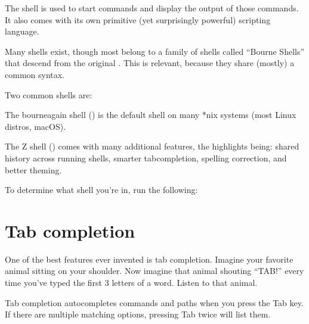 \sphinxAtStartPar
The shell is used to start commands and display the output of those commands.
It also comes with its own primitive (yet surprisingly powerful) scripting language.

\sphinxAtStartPar
Many shells exist, though most belong to a family of shells called “Bourne Shells”
that descend from the original . This is relevant, because they share (mostly)
a common syntax.

\sphinxAtStartPar
Two common shells are:
\begin{description}
\sphinxAtStartPar
The bourne\sphinxhyphen{}again shell () is the default shell on many *nix systems (most Linux distros, macOS).

\sphinxAtStartPar
The Z shell () comes with many additional features, the highlights being:
shared history across running shells, smarter tab\sphinxhyphen{}completion, spelling correction, and better theming.

\end{description}

\sphinxAtStartPar
To determine what shell you’re in, run the following:

\begin{sphinxVerbatim}[commandchars=\\\{\}]
\end{sphinxVerbatim}

\ignorespaces 

\section{Tab completion}
\label{\detokenize{intro/howto:tab-completion}}\label{\detokenize{intro/howto:index-9}}
\sphinxAtStartPar
One of the best features ever invented is tab completion. Imagine your favorite animal sitting
on your shoulder. Now imagine that animal shouting “TAB!” every time you’ve typed the first
3 letters of a word. Listen to that animal.

\sphinxAtStartPar
Tab completion autocompletes commands and paths when you press the Tab key.
If there are multiple matching options, pressing Tab twice will list them.

